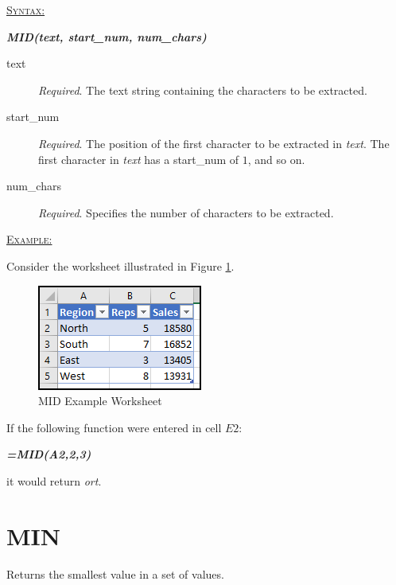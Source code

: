 \begin{addmargin}[1cm]{0cm}
	
	\medskip
	\underline{\textsc{Syntax:}}
	\medskip
	
	{\color{Syntax}
		\noindent\textbf{\textit{MID(text, start\_num, num\_chars)}}
	}
	
	\begin{description}
		\item[text] \textit{Required}. The text string containing the characters to be extracted.
		\item[start\_num] \textit{Required}. The position of the first character to be extracted in \textit{text}. The first character in \textit{text} has a start\_num of $ 1 $, and so on.
		\item[num\_chars] \textit{Required}. Specifies the number of characters to be extracted. 
	\end{description}

	\medskip
	\noindent\underline{\textsc{Example:}}
	\medskip
	
	\noindent Consider the worksheet illustrated in Figure \ref{apa:mid}.
	
	\begin{figure}[H]
		\centering
		\includegraphics[width=\maxwidth{.45\linewidth}]{gfx/apa_fig01}
		\caption{MID Example Worksheet}
		\label{apa:mid}
	\end{figure}
	
	\noindent If the following function were entered in cell $ E2 $:
	
	{\color{Syntax}
		\textit{\textbf{=MID(A2,2,3)}}
	}
	
	\noindent it would return \textit{ort}.

\end{addmargin}

\section{MIN}

Returns the smallest value in a set of values. 

